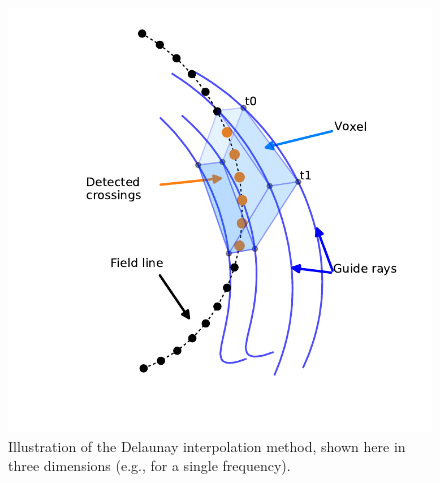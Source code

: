 \begin{figure}
\begin{center}
\includegraphics{figures/delaunay_1.pdf}
\caption[Delaunay interpolation method]{Illustration of the Delaunay interpolation method, shown here in three dimensions (e.g., for a single frequency).}
\label{fig:delaunay_1}
\end{center}
\end{figure}

